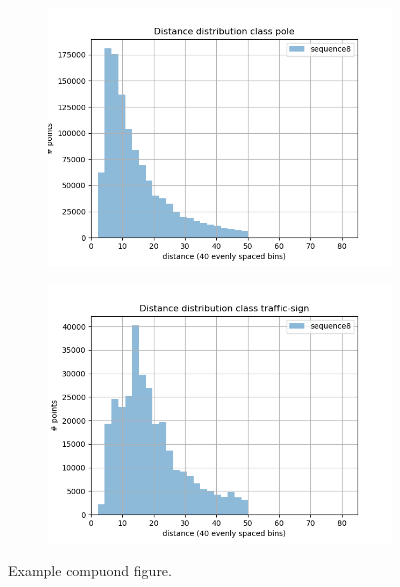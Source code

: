 \begin{figure}[h]
\begin{subfigure}[b]{0.24\textwidth}
         \includegraphics[width=\textwidth]{Figures/Chapter4/dist-height/dist/test/class18.png}
     \end{subfigure}
     \hfill
     \begin{subfigure}[b]{0.24\textwidth}
         \centering
         \includegraphics[width=\textwidth]{Figures/Chapter4/dist-height/dist/test/class19.png}
     \end{subfigure}
\caption{Example compuond figure.}        
\label{fig:distances}
\end{figure}